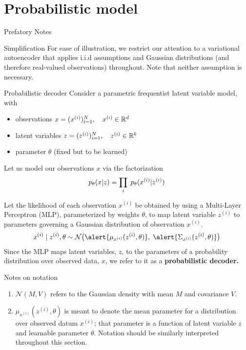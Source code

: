 \documentclass[10pt]{beamer}
\newcommand{\obs}{x^{(i)} }
\newcommand{\alatent}{z^{(i)} }
\newcommand{\N}{\mathcal{N}}
\begin{document}
\section{Probabilistic model}

\begin{frame}{Prefatory Notes}
\begin{sblock}{Simplification}
For ease of illustration, we restrict our attention to a variational autoencoder that applies i.i.d assumptions and Gaussian distributions (and therefore real-valued observations) throughout.    Note that neither assumption is necessary. 
\end{sblock}
\end{frame}


\begin{frame}{Probabilistic decoder}
\footnotesize
Consider a parametric frequentist latent variable model, with 
\begin{itemize}
\item observations $x = (\obs)_{i=1}^N, \quad \obs \in \R^d$
\item latent variables $z =(\alatent)_{i=1}^N, \quad \alatent \in \R^k$
\item parameter $\theta$ (fixed but to be learned)
\end{itemize}

Let us model our observations $x$ via the factorization
\[ p_\theta(x |z )= \ds\prod_i \; p_\theta( \obs | \alatent ) \] 
\pause 

Let the likelihood of each observation $\obs$ be obtained by using a Multi-Layer Perceptron (MLP), parameterized by weights $\theta$, to map latent variable $\alatent$ to \alert{parameters} governing a Gaussian distribution of observation $x^{(i)}$. \pause 
\begin{equation} x^{(i)} \cond \alatent, \theta \sim \N \big( \alert{\mu_{x^{(i)}}( \alatent, \theta)}, \; \alert{\Sigma_{x^{(i)}} (\alatent, \theta)} \big)  
\label{likelihood} 
\end{equation}
\pause 
Since the MLP maps latent variables, $z$, to the parameters of a probability distribution over observed data, $x$, we refer to it as a \bf{probabilistic decoder.}

\vfill

\tiny  Notes on notation
\begin{enumerate}
\item $\N(M,V)$ refers to the Gaussian density with mean $M$ and covariance $V$.
\item $\mu_{\obs}(\alatent, \theta)$ is meant to denote the mean parameter for a distribution over observed datum $\obs$; that parameter is a function of latent variable $z$ and learnable parameter $\theta$. Notation should be similarly interpreted throughout this section.
\end{enumerate}

\end{frame}
\end{document}
